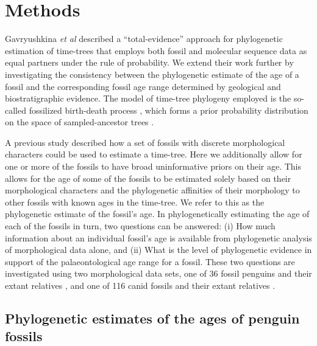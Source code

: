 \documentclass[11pt]{article}
\newcommand{\ncanidfossils}{{116}}
\begin{document}



\section*{Methods}

Gavryushkina {\it et al} \cite{gavryushkina2015bayesian} described a ``total-evidence'' approach \cite[implemented in BEAST2;][]{Beast2} for phylogenetic estimation of time-trees that employs both fossil and molecular sequence data as equal partners under the rule of probability. 
We extend their work further by investigating the consistency between the phylogenetic estimate of the age of a fossil and the corresponding fossil age range determined by geological and biostratigraphic evidence. 
The model of time-tree phylogeny employed is the so-called fossilized birth-death process \cite{Heath2014}, which forms a prior probability distribution on the space of sampled-ancestor trees \cite{Gavr2013}.

A previous study described how a set of fossils with discrete morphological characters could be used to estimate a time-tree. 
Here we additionally allow for one or more of the fossils to have broad uninformative priors on their age. 
This allows for the age of some of the fossils to be estimated solely based on their morphological characters and the phylogenetic affinities of their morphology to other fossils with known ages in the time-tree. 
We refer to this as the phylogenetic estimate of the fossil's age. 
In phylogenetically estimating the age of each of the fossils in turn, two questions can be answered: (i) How much information about an individual fossil's age is available from phylogenetic analysis of morphological data alone, and (ii) What is the level of phylogenetic evidence in support of the palaeontological age range for a fossil.
These two questions are investigated using two morphological data sets, one of 36 fossil penguins and their extant relatives \cite{ksepka2010,ksepka2012,gavryushkina2015bayesian}, and one of \ncanidfossils{} canid fossils and their extant relatives \cite{Slater2015}.

\subsection*{Phylogenetic estimates of the ages of penguin fossils}
\end{document}
